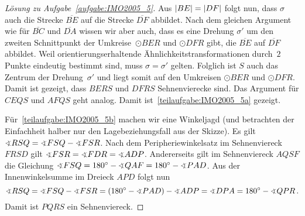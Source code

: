 \begin{proof}[Lösung zu Aufgabe~\ref{aufgabe:IMO2005_5}]
	Aus $\abs*{BE}=\abs*{DF}$ folgt nun, dass $\sigma$ auch die Strecke $\overline{BE}$ auf die Strecke $\overline{DF}$ abbildet. Nach dem gleichen Argument wie für $\overline{BC}$ und $\overline{DA}$ wissen wir aber auch, dass es eine Drehung $\sigma'$ um den zweiten Schnittpunkt der Umkreise~$\odot BER$ und $\odot DFR$ gibt, die $\overline{BE}$ auf $\overline{DF}$ abbildet. Weil orientierungserhaltende Ähnlichkeitstransformationen durch~$2$ Punkte eindeutig bestimmt sind, muss $\sigma=\sigma'$ gelten. Folglich ist $S$ auch das Zentrum der Drehung~$\sigma'$ und liegt somit auf den Umkreisen $\odot BER$ und $\odot DFR$. Damit ist gezeigt, dass $BERS$ und $DFRS$ Sehnenvierecke sind. Das Argument für $CEQS$ und $AFQS$ geht analog. Damit ist~\ref{teilaufgabe:IMO2005_5a} gezeigt.
	
	Für~\ref{teilaufgabe:IMO2005_5b} machen wir eine Winkeljagd (und betrachten der Einfachheit halber nur den Lagebeziehungsfall aus der Skizze). Es gilt $\winkel RSQ=\winkel FSQ-\winkel FSR$. Nach dem Peripheriewinkelsatz im Sehnenviereck $FRSD$ gilt $\winkel FSR=\winkel FDR=\winkel ADP$. Andererseits gilt im Sehnenviereck $AQSF$ die Gleichung $\winkel FSQ=180^\circ-\winkel QAF=180^\circ-\winkel PAD$. Aus der Innenwinkelsumme im Dreieck $APD$ folgt nun
	\begin{equation*}
		\winkel RSQ=\winkel FSQ-\winkel FSR=\parens*{180^\circ-\winkel PAD}-\winkel ADP=\winkel DPA=180^\circ-\winkel QPR\,.
	\end{equation*}
	Damit ist $PQRS$ ein Sehnenviereck.
\end{proof}
